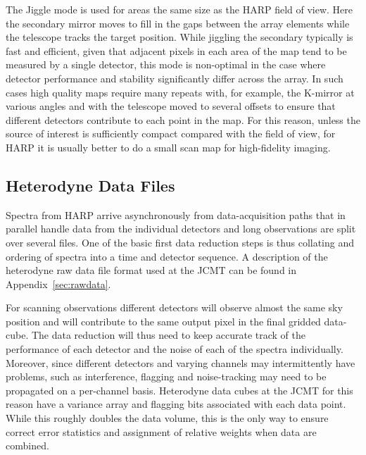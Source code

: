 \documentclass[useAMS,usenatbib]{mn2e}
\begin{document}
The Jiggle mode is used for areas the same size as the HARP field of
view. Here the secondary mirror moves to fill in the gaps between the
array elements while the telescope tracks the target position.  While
jiggling the secondary typically is fast and efficient, given that
adjacent pixels in each area of the map tend to be measured by a
single detector, this mode is non-optimal in the case where detector
performance and stability significantly differ across the array. In
such cases high quality maps require many repeats with, for example,
the K-mirror at various angles and with the telescope moved to several
offsets to ensure that different detectors contribute to each point in
the map. For this reason, unless the source of interest is
sufficiently compact compared with the field of view, for HARP it is
usually better to do a small scan map for high-fidelity imaging.


\subsection{Heterodyne Data Files}
\label{sec:format}

Spectra from HARP arrive asynchronously from data-acquisition paths
that in parallel handle data from the individual detectors and long
observations are split over several files. One of the basic first data
reduction steps is thus collating and ordering of spectra into a time
and detector sequence.  A description of the heterodyne raw data file
format used at the JCMT can be found in Appendix~\ref{sec:rawdata}.

For scanning observations different detectors will observe almost
the same sky position and will contribute to the same output pixel in
the final gridded data-cube. The data reduction will thus need to keep
accurate track of the performance of each detector and the noise of
each of the spectra individually. Moreover, since different detectors
and varying channels may intermittently have problems, such as
interference, flagging and noise-tracking may need to be propagated on a
per-channel basis. Heterodyne data cubes at the JCMT for this reason
have a variance array and flagging bits associated with each data point.
While this roughly doubles the data volume, this is the only way to
ensure correct error statistics and assignment of relative weights
when data are combined.
\end{document}

